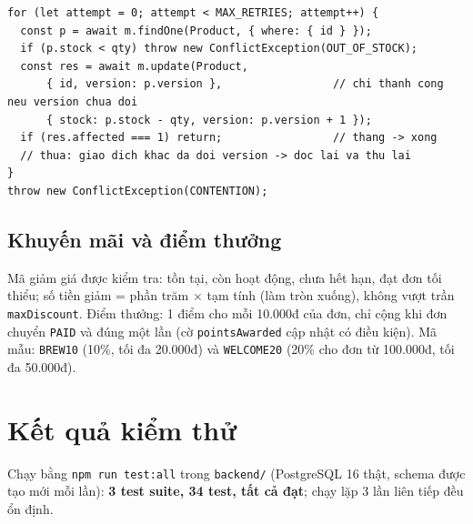 \documentclass[a4paper]{article}
\newcommand{\st}[1]{\texttt{#1}}
\begin{document}
\begin{lstlisting}[caption={Giữ kho bằng optimistic locking (stock.service.ts, rút gọn)}]
for (let attempt = 0; attempt < MAX_RETRIES; attempt++) {
  const p = await m.findOne(Product, { where: { id } });
  if (p.stock < qty) throw new ConflictException(OUT_OF_STOCK);
  const res = await m.update(Product,
      { id, version: p.version },                 // chi thanh cong neu version chua doi
      { stock: p.stock - qty, version: p.version + 1 });
  if (res.affected === 1) return;                 // thang -> xong
  // thua: giao dich khac da doi version -> doc lai va thu lai
}
throw new ConflictException(CONTENTION);
\end{lstlisting}

\subsection{Khuyến mãi và điểm thưởng}
Mã giảm giá được kiểm tra: tồn tại, còn hoạt động, chưa hết hạn, đạt đơn tối thiểu; số tiền giảm = phần trăm $\times$ tạm tính (làm tròn xuống), không vượt trần \texttt{maxDiscount}. Điểm thưởng: 1 điểm cho mỗi 10.000đ của đơn, chỉ cộng khi đơn chuyển \st{PAID} và đúng một lần (cờ \texttt{pointsAwarded} cập nhật có điều kiện). Mã mẫu: \texttt{BREW10} (10\%, tối đa 20.000đ) và \texttt{WELCOME20} (20\% cho đơn từ 100.000đ, tối đa 50.000đ).

\section{Kết quả kiểm thử}\label{sec:test}
Chạy bằng \texttt{npm run test:all} trong \texttt{backend/} (PostgreSQL 16 thật, schema được tạo mới mỗi lần): \textbf{3 test suite, 34 test, tất cả đạt}; chạy lặp 3 lần liên tiếp đều ổn định.
\end{document}
